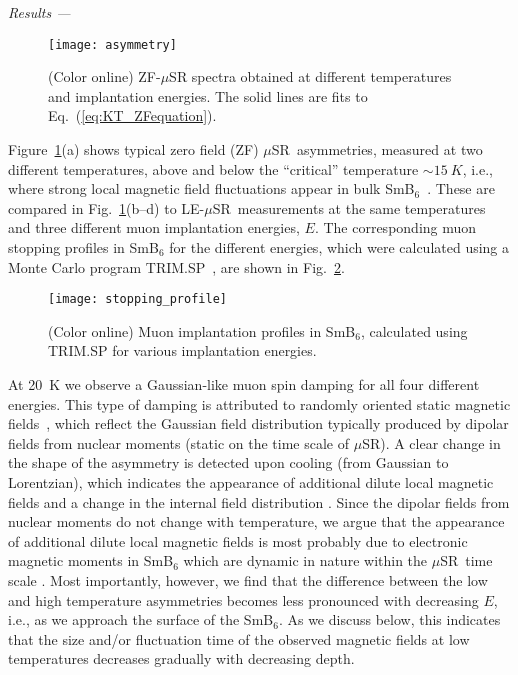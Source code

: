 \documentclass[10pt,aps,prb,twocolumn,showpacs,preprintnumbers,amsmath,amssymb,superscriptaddress,floatfix]{revtex4-1}
\newcommand{\msr}{$\mu$SR}
\newcommand{\lem}{LE-\msr}
\newcommand{\smb}{SmB$_6$}
\newcommand{\usim}{\sim \!}
\newcommand{\mysection}[1]{\smallskip\emph{#1 ---}\phantomsection}
\begin{document}
\mysection{Results}\label{sec:results}
%
\begin{figure}[hbt]
\texttt{[image: asymmetry]}
\caption{(Color online) ZF-\msr{} spectra obtained at different
  temperatures and implantation energies. The solid lines are fits to
  Eq.~(\ref{eq:KT_ZFequation}).}
 \label{fig:asymmetry}
\end{figure}
Figure~\ref{fig:asymmetry}(a) shows typical zero field (ZF) \msr\
asymmetries, measured at two different temperatures, above and below
the \enquote{critical} temperature $\usim\SI{15}{K}$, i.e., where
strong local magnetic field fluctuations appear in bulk
\smb{}~\cite{Biswas2014prb}. These are compared in
Fig.~\ref{fig:asymmetry}(b--d) to \lem\ measurements at the same
temperatures and three different muon implantation energies, $E$. The
corresponding muon stopping profiles in \smb{} for the different
energies, which were calculated using a Monte Carlo program
TRIM.SP~\cite{Morenzoni2002nimb}, are shown in
Fig.~\ref{fig:stopping_profile}.
\begin{figure}[hb]
\texttt{[image: stopping\_profile]}
\caption{(Color online) Muon implantation profiles in \smb{},
  calculated using TRIM.SP for various implantation energies.}
 \label{fig:stopping_profile}
\end{figure}
At \SI{20}{K} we observe a Gaussian-like muon spin damping for all
four different energies. This type of damping is attributed to
randomly oriented static magnetic fields~\cite{Yaouanc2010}, which
reflect the Gaussian field distribution typically produced by dipolar
fields from nuclear moments (static on the time scale of \msr). A
clear change in the shape of the asymmetry is detected upon cooling
(from Gaussian to Lorentzian), which indicates the appearance of
additional dilute local magnetic fields and a change in the internal
field distribution \cite{Uemura1985prb}. Since the dipolar fields from
nuclear moments do not change with temperature, we argue that the
appearance of additional dilute local magnetic fields is most probably
due to electronic magnetic moments in \smb{} which are dynamic in
nature within the \msr\ time scale \cite{Biswas2014prb}. Most
importantly, however, we find that the difference between the low and
high temperature asymmetries becomes less pronounced with decreasing
$E$, i.e., as we approach the surface of the \smb{}. As we discuss
below, this indicates that the size and/or fluctuation time of the
observed magnetic fields at low temperatures decreases gradually with
decreasing depth.
\end{document}
